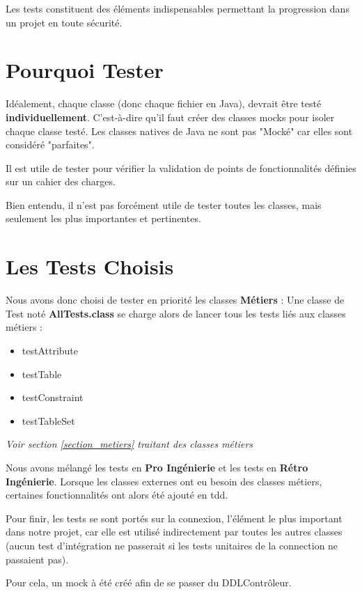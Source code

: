 Les tests constituent des éléments indispensables permettant la progression dans un projet en toute sécurité.
\section{Pourquoi Tester}

Idéalement, chaque classe (donc chaque fichier en Java), devrait être testé \textbf{individuellement}. C'est-à-dire qu'il faut créer des classes \Glspl{mock} pour isoler chaque classe testé.
Les classes natives de Java ne sont pas "Mocké" car elles sont considéré "parfaites".

Il est utile de tester pour vérifier la validation de points de fonctionnalités définies sur un cahier des charges.

Bien entendu, il n'est pas forcément utile de tester toutes les classes, mais seulement les plus importantes et pertinentes.

\section{Les Tests Choisis}

Nous avons donc choisi de tester en priorité les classes \textbf{Métiers} : Une classe de Test noté \textbf{AllTests.class} se charge alors de lancer tous les tests liés aux classes métiers : 
\begin{itemize}
	\item testAttribute
	\item testTable
	\item testConstraint
	\item testTableSet
\end{itemize}

\textit{Voir section \ref{section_metiers} traitant des classes métiers}


Nous avons mélangé les tests en \textbf{Pro Ingénierie} et les tests en \textbf{Rétro Ingénierie}. 
Lorsque les classes externes ont eu besoin des classes métiers, certaines fonctionnalités ont alors été ajouté en \gls{tdd}.

Pour finir, les tests se sont portés sur la connexion, l'élément le plus important dans notre projet, 
car elle est utilisé indirectement par toutes les autres classes (aucun test d'intégration ne passerait 
si les tests unitaires de la connection ne passaient pas).

Pour cela, un \Gls{mock} à été créé afin de se passer du DDLContrôleur.

